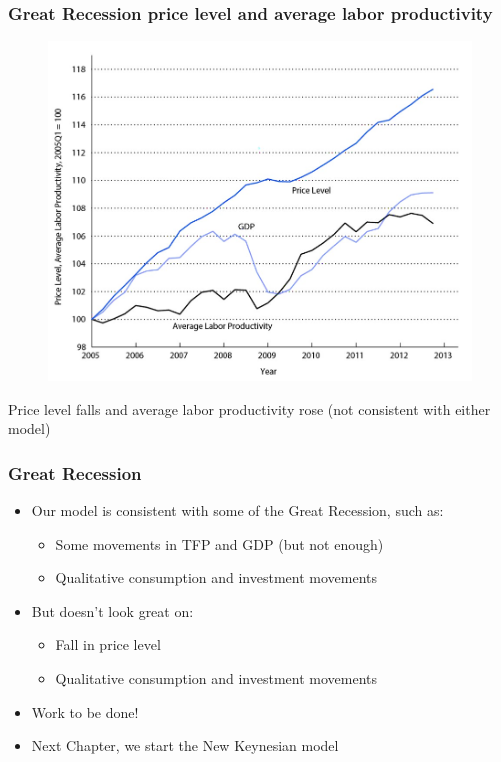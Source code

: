 \documentclass{beamer}
\begin{document}
\begin{frame}
\frametitle[alignment=center]{Great Recession price level and average labor productivity}
\begin{figure}
\centering
\includegraphics[scale=0.65]{Figures/W_Fig_13pt15.png}
\end{figure}
Price level falls and average labor productivity rose (not consistent with either model)
\end{frame}


\begin{frame}
\frametitle[alignment=center]{Great Recession}
\begin{itemize}
\item Our model is consistent with some of the Great Recession, such as:
\bigskip
\begin{itemize}
\item Some movements in TFP and GDP (but not enough)
\bigskip
\item Qualitative consumption and investment movements
\end{itemize}
\bigskip
\item But doesn't look great on:
\bigskip
\begin{itemize}
\item Fall in price level
\bigskip
\item Qualitative consumption and investment movements
\end{itemize}
\bigskip
\item Work to be done!
\bigskip
\item Next Chapter, we start the New Keynesian model
\end{itemize}
\end{frame}
\end{document}
